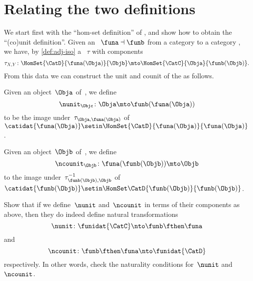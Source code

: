 
\section{Relating the two definitions}
\label{relate-adj-defs}

We start first with the ``hom-set definition'' of , and show how to obtain the ``(co)unit definition''.
Given an ~$\funa \dashv \funb$ from a category \CatC to a category \CatD, we have, by \cref{def:adj-iso} a ~$\tau$ with components
\begin{equation}
    \tau_{X,Y} \colon \HomSet{\CatD}{\funa(\Obja)}{\Objb} \mto \HomSet{\CatC}{\Obja}{\funb(\Objb)}.
\end{equation}
From this data we can construct the unit and counit of the  as follows.

Given an object~$\Obja$ of~\CatC, we define
%
\begin{equation}
    \nunit_\Objc \colon \Obja \mto \funb(\funa(\Obja))
\end{equation}
%
to be the image under~$\tau_{\Obja, \funa(\Obja)}$ of~$\catidat{\funa(\Obja)} \setin \HomSet{\CatD}{\funa (\Obja)}{\funa(\Obja)}$.

Given an object~$\Objb$ of~\CatD, we define
\begin{equation}
    \ncounit_\Objb \colon \funa(\funb(\Objb)) \mto \Objb
\end{equation}
to the image under~$\tau_{\funb(\Objb), \Objb}^{-1}$ of~$\catidat{\funb(\Objb)} \setin \HomSet\CatD{\funb(\Objb)}{\funb(\Objb)}$.

\begin{exercise}
    \label{ex:eta-epsilon}

    Show that if we define~$\nunit$ and~$\ncounit$ in terms of their components as above, then they do indeed define natural transformations
    \begin{equation}
        \nunit\colon \funidat{\CatC} \nto \funb\fthen \funa
    \end{equation}
    and
    \begin{equation}
        \ncounit\colon \funb \fthen \funa \nto \funidat{\CatD}
    \end{equation}
    respectively.
    In other words, check the naturality conditions for~$\nunit$ and~$\ncounit$.
\end{exercise}

